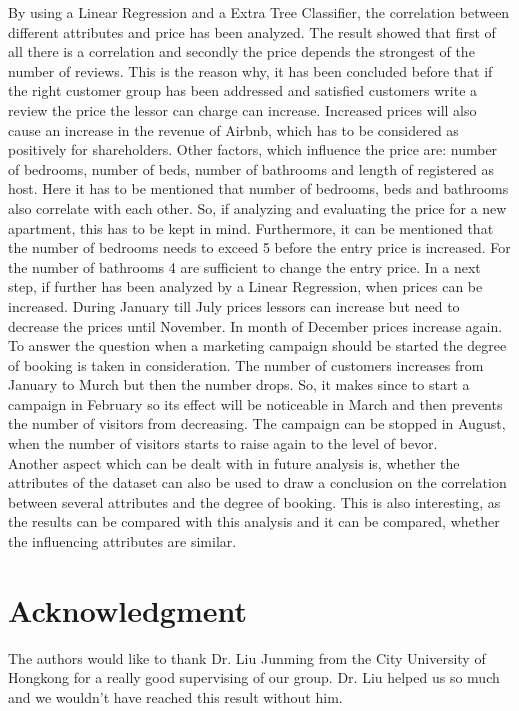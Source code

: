 \documentclass[journal]{IEEEtran}
\begin{document}
By using a Linear Regression and a Extra Tree Classifier, the correlation between different attributes and price has been analyzed. The result showed that first of all there is a correlation and secondly the price depends the strongest of the number of reviews. This is the reason why, it has been concluded before that if the right customer group has been addressed and satisfied customers write a review the price the lessor can charge can increase. Increased prices will also cause an increase in the revenue of Airbnb, which has to be considered as positively for shareholders. Other factors, which influence the price are: number of bedrooms, number of beds, number of bathrooms and length of registered as host. Here it has to be mentioned that number of bedrooms, beds and bathrooms also correlate with each other. So, if analyzing and evaluating the price for a new apartment, this has to be kept in mind. Furthermore, it can be mentioned that the number of bedrooms needs to exceed 5 before the entry price is increased. For the number of bathrooms 4 are sufficient to change the entry price. In a next step, if further has been analyzed by a Linear Regression, when prices can be increased. During January till July prices lessors can increase but need to decrease the prices until November. In month of December prices increase again.\\
To answer the question when a marketing campaign should be started the degree of booking is taken in consideration. The number of customers increases from January to Murch but then the number drops. So, it makes since to start a campaign in February so its effect will be noticeable in March and then prevents the number of visitors from decreasing. The campaign can be stopped in August, when the number of visitors starts to raise again to the level of bevor.\\
Another aspect which can be dealt with in future analysis is, whether the attributes of the dataset can also be used to draw a conclusion on the correlation between several attributes and the degree of booking. This is also interesting, as the results can be compared with this analysis and it can be compared, whether the influencing attributes are similar.





\section*{Acknowledgment}
\noindent The authors would like to thank Dr. Liu Junming from the City University of Hongkong for a really good supervising of our group. Dr. Liu helped us so much and we wouldn't have reached this result without him. 
\end{document}
